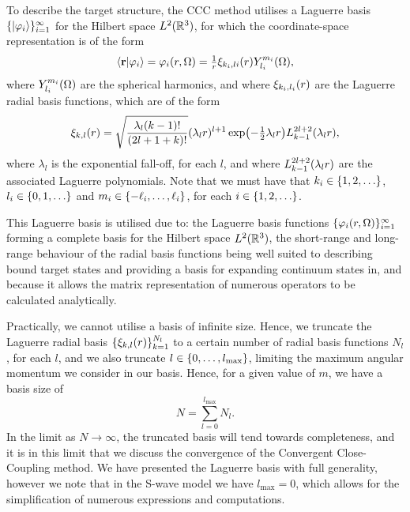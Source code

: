 \documentclass[]{article}
\begin{document}
To describe the target structure, the CCC method utilises a Laguerre basis
$\lbrace\ket{\varphi_{i}}\rbrace_{i = 1}^{\infty}$ for the Hilbert space
$L^{2}(\mathbb{R}^{3})$, for which the coordinate-space representation is of the
form
\begin{equation}
  \label{eq:laguerre-basis}
  \bra{\vb{r}}
  \ket{\varphi_{i}}
  =
  \varphi_{i}(r, \Omega)
  =
  \tfrac{1}{r}
  \xi_{k_{i}, l{i}}(r)
  Y_{l_{i}}^{m_{i}}(\Omega)
  ,
\end{equation}
where $Y_{l_{i}}^{m_{i}}(\Omega)$ are the spherical harmonics, and where
$\xi_{k_{i}, l_{i}}(r)$ are the Laguerre radial basis functions, which are of
the form
\begin{equation}
  \label{eq:laguerre-radial-basis}
  \xi_{k, l}\lr{r}
  =
  \sqrt
  {
    \dfrac
    {
      \lambda_{l}
      \lr{k - 1}!
    }
    {
      \lr{2l + 1 + k}!
    }
  }
  \lr{\lambda_{l} r}^{l + 1}
  \exponential\lr[\big]{- \tfrac{1}{2} \lambda_{l} r}
  L_{k - 1}^{2l + 2}\lr{\lambda_{l} r}
  ,
\end{equation}
where $\lambda_{l}$ is the exponential fall-off, for each $l$, and where
$L_{k - 1}^{2l + 2}(\lambda_{l} r)$ are the associated Laguerre polynomials.
Note that we must have that
$k_{i} \in \lrset{1, 2, \dotsc}$,
$l_{i} \in \lrset{0, 1, \dotsc}$ and
$m_{i} \in \lbrace-\ell_{i}, \dotsc, \ell_{i}\rbrace$, for each
$i \in \lrset{1, 2, \dotsc}$.

This Laguerre basis is utilised due to: the Laguerre basis functions
$\lbrace\varphi_{i}(r, \Omega)\rbrace_{i = 1}^{\infty}$ forming a complete basis
for the Hilbert space $L^{2}(\mathbb{R}^{3})$, the short-range and long-range
behaviour of the radial basis functions being well suited to describing bound
target states and providing a basis for expanding continuum states in, and
because it allows the matrix representation of numerous operators to be
calculated analytically.

Practically, we cannot utilise a basis of infinite size.
Hence, we truncate the Laguerre radial basis
$\lbrace\xi_{k, l}(r)\rbrace_{k = 1}^{N_{l}}$ to a certain number of radial basis
functions $N_{l}$, for each $l$, and we also truncate
$l \in \lbrace0, \dotsc, l_{\max}\rbrace$,
limiting the maximum angular momentum we consider in our basis.
Hence, for a given value of $m$, we have a basis size of
\begin{equation}
  \label{eq:basis-size}
  N
  =
  \sum_{l = 0}^{l_{\max}}
  N_{l}
  .
\end{equation}
In the limit as $N \to \infty$, the truncated basis will tend towards
completeness, and it is in this limit that we discuss the convergence of the
Convergent Close-Coupling method.
We have presented the Laguerre basis with full generality, however we note that
in the S-wave model we have $l_{\max} = 0$, which allows for the simplification
of numerous expressions and computations.
\end{document}
